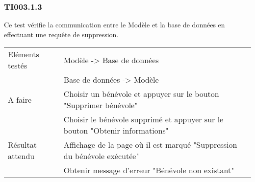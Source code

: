 
  	\subsubsection{TI003.1.3}
  		Ce test vérifie la communication entre le Modèle et la base de données en effectuant une requête de suppression.
  		\begin{center}
    	 		\begin{tabular}[h]{|p{}|p{}|}
			\hline
				Eléments testés & Modèle -> Base de données  \\
							    &  Base de données -> Modèle \\\hline
    				A faire & Choisir un bénévole et appuyer sur le bouton "Supprimer bénévole" \\
    						& Choisir le bénévole supprimé et appuyer sur le bouton "Obtenir informations" \\\hline
    				Résultat attendu & Affichage de la page où il est marqué "Suppression du bénévole exécutée" \\  								 & Obtenir message d'erreur "Bénévole non existant" \\\hline
     		\end{tabular}
  		\end{center}	